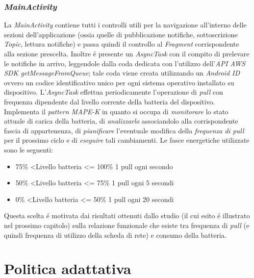 \documentclass{article}
\begin{document}
\subsubsection{\textit{MainActivity}}
La \textit{MainActivity} contiene tutti i controlli utili per la navigazione all'interno delle sezioni dell'applicazione (ossia quelle di pubblicazione notifiche, sottoscrizione \textit{Topic}, lettura notifiche) e passa quindi il controllo al \textit{Fragment} corrispondente alla sezione prescelta. Inoltre \'e presente un \textit{AsyncTask} con il compito di prelevare le notifiche in arrivo, leggendole dalla coda dedicata con l'utilizzo dell'\textit{API AWS SDK getMessageFromQueue}; tale coda viene creata utilizzando un \textit{Android ID} ovvero un codice identificativo unico per ogni sistema operativo installato su dispositivo. L'\textit{AsyncTask} effettua periodicamente l'operazione di \textit{pull} con frequenza dipendente dal livello corrente della batteria del dispositivo. Implementa il \textit{pattern MAPE-K} in quanto si occupa di \textit{monitorare} lo stato attuale di carica della batteria, di \textit{analizzarlo} associandolo alla corrispondente fascia di appartenenza, di \textit{pianificare} l'eventuale modifica della \textit{frequenza di pull} per il prossimo ciclo e di \textit{eseguire} tali cambiamenti. Le fasce energetiche utilizzate sono le seguenti: 
\begin{itemize}
\item   75\% \textless  Livello batteria \textless= 100\%  1 pull ogni secondo
\item	50\% \textless  Livello batteria \textless= 75\%   1 pull ogni 5 secondi
\item	0\% \textless  Livello batteria \textless= 50\%   1 pull ogni 20 secondi
\end{itemize}
 
Questa scelta \'e motivata dai risultati ottenuti dallo studio (il cui esito \'e illustrato nel prossimo capitolo) sulla relazione funzionale che esiste tra frequenza di \textit{pull} (e quindi frequenza di utilizzo della scheda di rete) e consumo della batteria.

\newpage
\section{Politica adattativa}
\end{document}

